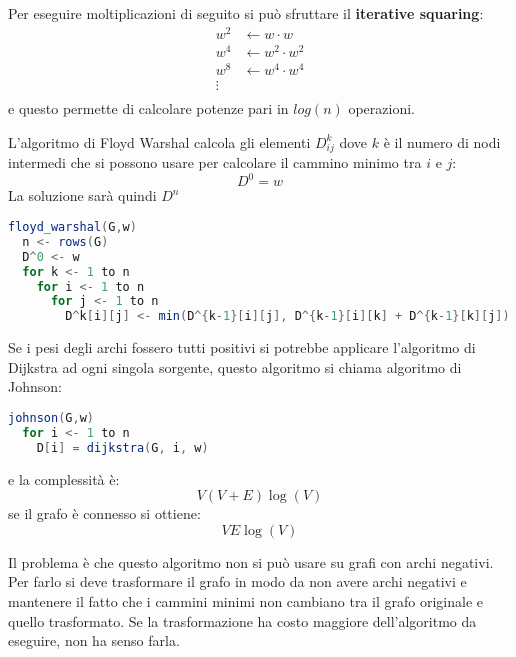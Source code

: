 \documentclass[a4paper]{article}
\begin{document}
Per eseguire moltiplicazioni di seguito si può sfruttare il \textbf{iterative squaring}:
\[
  \begin{aligned}
    w^2 & \leftarrow w \cdot w \\
    w^4 & \leftarrow w^2 \cdot w^2 \\
    w^8 & \leftarrow w^4 \cdot w^4 \\
    \vdots & \\
  \end{aligned}
\] 
e questo permette di calcolare potenze pari in \( log(n) \) operazioni.

\vspace{1em}
\noindent
L'algoritmo di Floyd Warshal calcola gli elementi \( D_{ij}^k \) dove \( k \) è il numero
di nodi intermedi che si possono usare per calcolare il cammino minimo tra \( i \) e \( j \):
\[
  D^0 = w
\] 
La soluzione sarà quindi \( D^n \) 
\begin{lstlisting}[language=Scala]
floyd_warshal(G,w)
  n <- rows(G)
  D^0 <- w
  for k <- 1 to n
    for i <- 1 to n
      for j <- 1 to n
        D^k[i][j] <- min(D^{k-1}[i][j], D^{k-1}[i][k] + D^{k-1}[k][j])
\end{lstlisting}
\begin{figure}[H]
  \centering
\end{figure}

\vspace{1em}
\noindent
Se i pesi degli archi fossero tutti positivi si potrebbe applicare l'algoritmo di
Dijkstra ad ogni singola sorgente, questo algoritmo si chiama algoritmo di Johnson:
\begin{lstlisting}[language=Scala]
johnson(G,w)
  for i <- 1 to n
    D[i] = dijkstra(G, i, w)
\end{lstlisting}
e la complessità è:
\[
  V(V+E) \log(V)
\] 
se il grafo è connesso si ottiene:
\[
  VE \log(V)
\] 

Il problema è che questo algoritmo non si può usare su grafi con archi negativi. Per farlo
si deve trasformare il grafo in modo da non avere archi negativi e mantenere il fatto che
i cammini minimi non cambiano tra il grafo originale e quello trasformato. Se la trasformazione
ha costo maggiore dell'algoritmo da eseguire, non ha senso farla.
\end{document}
